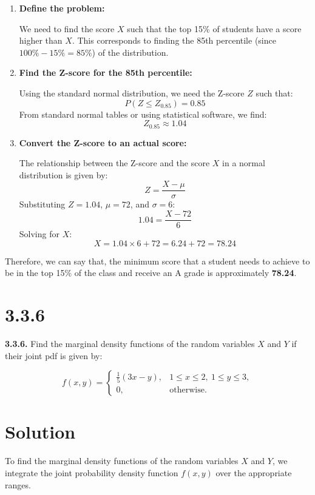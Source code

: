 \documentclass{article}
\begin{document}
\begin{enumerate}
    \item \textbf{Define the problem:}
    
    We need to find the score \(X\) such that the top 15\% of students have a score higher than \(X\). This corresponds to finding the 85th percentile (since \(100\% - 15\% = 85\%\)) of the distribution.
    
    \item \textbf{Find the Z-score for the 85th percentile:}
    
    Using the standard normal distribution, we need the Z-score \(Z\) such that:
    \[
    P(Z \leq Z_{0.85}) = 0.85
    \]
    From standard normal tables or using statistical software, we find:
    \[
    Z_{0.85} \approx 1.04
    \]
    
    \item \textbf{Convert the Z-score to an actual score:}
    
    The relationship between the Z-score and the score \(X\) in a normal distribution is given by:
    \[
    Z = \frac{X - \mu}{\sigma}
    \]
    Substituting \(Z = 1.04\), \(\mu = 72\), and \(\sigma = 6\):
    \[
    1.04 = \frac{X - 72}{6}
    \]
    Solving for \(X\):
    \[
    X = 1.04 \times 6 + 72 = 6.24 + 72 = 78.24
    \]
\end{enumerate}

Therefore, we can say that, the minimum score that a student needs to achieve to be in the top 15\% of the class and receive an A grade is approximately \textbf{78.24}.


\section*{3.3.6}

\textbf{3.3.6.} Find the marginal density functions of the random variables \(X\) and \(Y\) if their joint pdf is given by:

\[
f(x, y) = 
\begin{cases} 
\frac{1}{5}(3x - y), & 1 \leq x \leq 2, \ 1 \leq y \leq 3, \\
0, & \text{otherwise}.
\end{cases}
\]


\section*{Solution}

To find the marginal density functions of the random variables \(X\) and \(Y\), we integrate the joint probability density function \(f(x, y)\) over the appropriate ranges.
\end{document}
